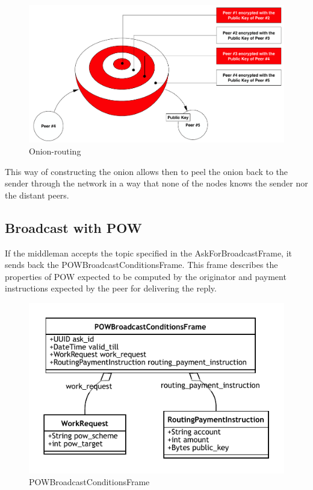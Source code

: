 \documentclass{article}
\begin{document}
\begin{figure}
	\centering
	\includegraphics[scale=0.5]{onion.pdf}
	\caption{Onion-routing}
	\label{fig:fr:onionrouting}
\end{figure}

This way of constructing the onion allows then to peel the onion back to the sender through the network in a way that none of the nodes knows the sender nor the distant peers.

\subsection{Broadcast with POW}

If the middleman accepts the topic specified in the AskForBroadcastFrame, it sends back the POWBroadcastConditionsFrame. This frame describes the properties of POW expected to be computed by the originator and payment instructions expected by the peer for delivering the reply.

\begin{figure}
	\centering
	\includegraphics[scale=1.0]{POWBroadcastCondition.pdf}
	\caption{POWBroadcastConditionsFrame}
	\label{fig:fr:powbroadcastcondition}
\end{figure}
\end{document}
